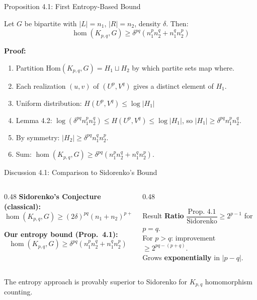 \documentclass[10pt]{beamer}
\begin{document}
\begin{frame}{Proposition 4.1: First Entropy-Based Bound}
  \begin{theorem}[Proposition 4.1]
    Let $G$ be bipartite with $|L| = n_1$, $|R| = n_2$, density $\delta$. Then:
    \[
      \hom(K_{p,q}, G) \geq \delta^{pq}(n_1^p n_2^q + n_1^q n_2^p)
    \]
  \end{theorem}

  \textbf{Proof:}
  \begin{enumerate}
    \item Partition $\mathrm{Hom}(K_{p,q}, G) = H_1 \sqcup H_2$ by which partite sets map where.
    \item Each realization $(u,v)$ of $(U^p, V^q)$ gives a distinct element of $H_1$.
    \item Uniform distribution: $H(U^p, V^q) \leq \log |H_1|$
    \item Lemma 4.2: $\log(\delta^{pq} n_1^p n_2^q) \leq H(U^p, V^q) \leq \log |H_1|$, so $|H_1| \geq \delta^{pq} n_1^p n_2^q$.
    \item By symmetry: $|H_2| \geq \delta^{pq} n_1^q n_2^p$.
    \item Sum: $\hom(K_{p,q}, G) \geq \delta^{pq}(n_1^p n_2^q + n_1^q n_2^p)$.
  \end{enumerate}
\end{frame}

\begin{frame}{Discussion 4.1: Comparison to Sidorenko's Bound}
  \begin{columns}
    \begin{column}{0.48\textwidth}
      \textbf{Sidorenko's Conjecture (classical):}
      \[
        \hom(K_{p,q}, G) \geq (2\delta)^{pq}(n_1 + n_2)^{p+q-2} \cdots
      \]

      \textbf{Our entropy bound (Prop.\ 4.1):}
      \[
        \hom(K_{p,q}, G) \geq \delta^{pq}(n_1^p n_2^q + n_1^q n_2^p)
      \]
    \end{column}
    \begin{column}{0.48\textwidth}
      \begin{alertblock}{Result}
        \textbf{Ratio} $\dfrac{\text{Prop.\ 4.1}}{\text{Sidorenko}} \geq 2^{p-1}$ for $p = q$.\\[0.4em]
        For $p > q$: improvement $\geq 2^{pq-(p+q)}$.\\[0.3em]
        Grows \textbf{exponentially} in $|p - q|$.
      \end{alertblock}
    \end{column}
  \end{columns}
  \vspace{0.5em}
  The entropy approach is provably superior to Sidorenko for $K_{p,q}$ homomorphism counting.
\end{frame}
\end{document}

